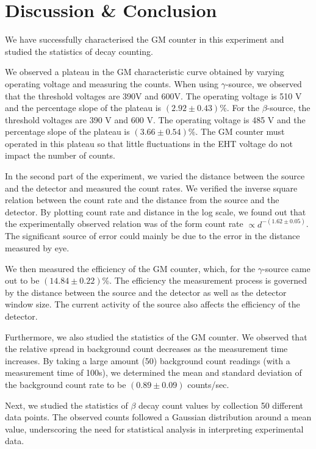\section{Discussion \& Conclusion}

We have successfully characterised the GM counter in this experiment and studied the statistics of decay counting.

We observed a plateau in the GM characteristic curve obtained by varying operating voltage and measuring the counts. When using $\gamma$-source, we observed that the threshold voltages are 390V and 600V. The operating voltage is 510 V and the percentage slope of the plateau is $(2.92\pm 0.43)\%$.
For the $\beta$-source, the threshold voltages are 390 V and 600 V. The operating voltage is 485 V and the percentage slope of the plateau is $(3.66\pm 0.54)\%$. The GM counter must operated in this plateau so that little fluctuations in the EHT voltage do not impact the number of counts.

In the second part of the experiment, we varied the distance between the source and the detector and measured the count rates. We verified the inverse square relation between the count rate and the distance from the source and the detector. By plotting count rate and distance in the log scale, we found out that the experimentally observed relation was of the form count rate $\propto d^{-(1.62 \pm 0.05)}$. The significant source of error could mainly be due to the error in the distance measured by eye.

We then measured the efficiency of the GM counter, which, for the $\gamma$-source came out to be $(14.84 \pm 0.22)$\%. The efficiency the measurement process is governed by the distance between the source and the detector as well as the detector window size. The current activity of the source also affects the efficiency of the detector. 

Furthermore, we also studied the statistics of the GM counter. We observed that the relative spread in background count decreases as the measurement time increases. By taking a large amount (50) background count readings (with a measurement time of 100s), we determined the mean and standard deviation of the background count rate to be $(0.89\pm 0.09)$ counts/sec.

Next, we studied the statistics of $\beta$ decay count values by collection 50 different data points. The observed counts followed a Gaussian distribution around a mean value, underscoring the need for statistical analysis in interpreting experimental data.

